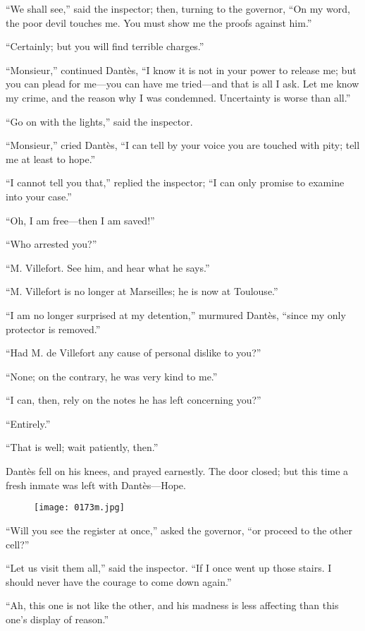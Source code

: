 “We shall see,” said the inspector; then, turning to the governor, “On
my word, the poor devil touches me. You must show me the proofs against
him.”

“Certainly; but you will find terrible charges.”

“Monsieur,” continued Dantès, “I know it is not in your power to
release me; but you can plead for me—you can have me tried—and that is
all I ask. Let me know my crime, and the reason why I was condemned.
Uncertainty is worse than all.”

“Go on with the lights,” said the inspector.

“Monsieur,” cried Dantès, “I can tell by your voice you are touched
with pity; tell me at least to hope.”

“I cannot tell you that,” replied the inspector; “I can only promise to
examine into your case.”

“Oh, I am free—then I am saved!”

“Who arrested you?”

“M. Villefort. See him, and hear what he says.”

“M. Villefort is no longer at Marseilles; he is now at Toulouse.”

“I am no longer surprised at my detention,” murmured Dantès, “since my
only protector is removed.”

“Had M. de Villefort any cause of personal dislike to you?”

“None; on the contrary, he was very kind to me.”

“I can, then, rely on the notes he has left concerning you?”

“Entirely.”

“That is well; wait patiently, then.”

Dantès fell on his knees, and prayed earnestly. The door closed; but
this time a fresh inmate was left with Dantès—Hope.

\begin{figure}[h]
\texttt{[image: 0173m.jpg]}
\end{figure}

“Will you see the register at once,” asked the governor, “or proceed to
the other cell?”

“Let us visit them all,” said the inspector. “If I once went up those
stairs. I should never have the courage to come down again.”

“Ah, this one is not like the other, and his madness is less affecting
than this one’s display of reason.”

